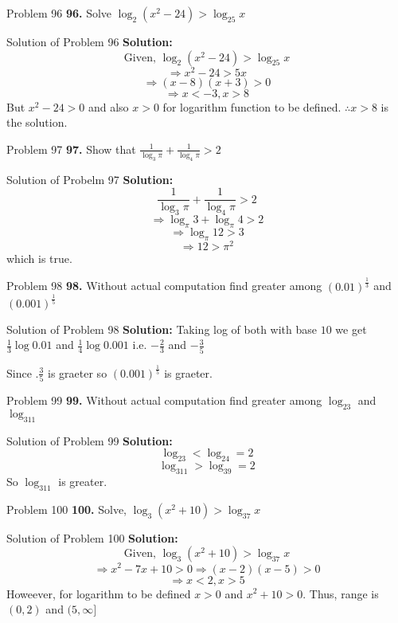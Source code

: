 \documentclass[aspectratio=1610,8pt]{beamer}
\begin{document}
\begin{frame}{Problem 96}
  \textbf{96.} Solve $\log_2(x^2 - 24) > \log_25x$
\end{frame}
\begin{frame}{Solution of Problem 96}
  \textbf{Solution:} $$\text{Given,~}\log_2(x^2 - 24) > \log_25x$$
  $$\Rightarrow x^2 - 24 > 5x$$
  $$\Rightarrow (x - 8)(x + 3) > 0$$
  $$\Rightarrow x< -3, x > 8$$
  But $x^2 -24 > 0$ and also $x > 0$ for logarithm function to  be defined. $\therefore x > 8$ is the solution.
\end{frame}
\begin{frame}{Problem 97}
  \textbf{97.} Show that $\frac{1}{\log_3\pi} + \frac{1}{\log_4\pi} > 2$
\end{frame}
\begin{frame}{Solution of Probelm 97}
  \textbf{Solution:} $$\frac{1}{\log_3\pi} + \frac{1}{\log_4\pi} > 2$$
  $$\Rightarrow \log_{\pi}3 + \log_{\pi}4 > 2$$
  $$\Rightarrow \log_{\pi}12 > 3$$
  $$\Rightarrow 12 > \pi^2$$
  which is true.
\end{frame}
\begin{frame}{Problem 98}
  \textbf{98.} Without actual computation find greater among $(0.01)^{\frac{1}{3}}$ and $(0.001)^{\frac{1}{5}}$
\end{frame}
\begin{frame}{Solution of Problem 98}
  \textbf{Solution:} Taking log of both with base $10$ we get $\frac{1}{3}\log0.01$ and $\frac{1}{4}\log 0.001$ i.e. $-\frac{2}{3}$ and $-\frac{3}{5}$

  Since $.\frac{3}{5}$ is graeter so $(0.001)^{\frac{1}{5}}$ is graeter.
\end{frame}
\begin{frame}{Problem 99}
  \textbf{99.} Without actual computation find greater among $\log_23$ and $\log_311$
\end{frame}
\begin{frame}{Solution of Problem 99}
  \textbf{Solution:} $$\log_23 < \log_24 =2$$
  $$\log_311 > \log_39 = 2$$
  So $\log_311$ is greater.
\end{frame}
\begin{frame}{Problem 100}
  \textbf{100.} Solve, $\log_3(x^2 + 10) > \log_37x$
\end{frame}
\begin{frame}{Solution of Problem 100}
  \textbf{Solution:} $$\text{Given,~}\log_3(x^2 + 10) > \log_37x$$
  $$\Rightarrow x^2 - 7x + 10 > 0 \Rightarrow (x - 2)(x - 5) > 0$$
  $$\Rightarrow x < 2, x > 5$$
  Howeever, for logarithm to be defined $x > 0$ and $x^2 + 10 > 0.$ Thus, range is $(0, 2)$ and $(5, \infty]$
\end{frame}
\end{document}
